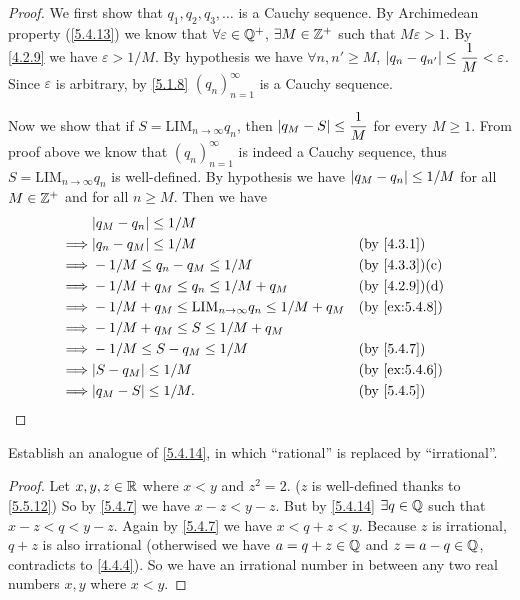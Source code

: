 \begin{proof}
  We first show that \(q_1, q_2, q_3, \dots\) is a Cauchy sequence.
  By Archimedean property (\cref{5.4.13}) we know that \(\forall \varepsilon \in \mathbb{Q}^+\), \(\exists M \in \mathbb{Z}^+\) such that \(M\varepsilon > 1\).
  By \cref{4.2.9} we have \(\varepsilon > 1 / M\).
  By hypothesis we have \(\forall n, n' \geq M\), \(\left\lvert q_n - q_{n'}\right\rvert \leq \dfrac{1}{M} < \varepsilon\).
  Since \(\varepsilon\) is arbitrary, by \cref{5.1.8} \((q_n)_{n = 1}^{\infty}\) is a Cauchy sequence.

  Now we show that if \(S = \text{LIM}_{n \to \infty} q_n\), then \(\left\lvert q_M - S\right\rvert \leq \dfrac{1}{M}\) for every \(M \geq 1\).
  From proof above we know that \((q_n)_{n = 1}^\infty\) is indeed a Cauchy sequence, thus \(S = \text{LIM}_{n \to \infty} q_n\) is well-defined.
  By hypothesis we have \(\left\lvert q_M - q_n\right\rvert \leq 1 / M\) for all \(M \in \mathbb{Z}^+\) and for all \(n \geq M\).
  Then we have
  \begin{align*}
             & \abs{q_M - q_n} \leq 1 / M                                                                        \\
    \implies & \abs{q_n - q_M} \leq 1 / M                                       &  & \by{4.3.1}                  \\
    \implies & -1 / M \leq q_n - q_M \leq 1 / M                                 &  & \text{(by \cref{4.3.3})(c)} \\
    \implies & -1 / M + q_M \leq q_n \leq 1 / M + q_M                           &  & \text{(by \cref{4.2.9})(d)} \\
    \implies & -1 / M + q_M \leq \text{LIM}_{n \to \infty} q_n \leq 1 / M + q_M &  & \by{ex:5.4.8}               \\
    \implies & -1 / M + q_M \leq S \leq 1 / M + q_M                                                              \\
    \implies & -1 / M \leq S - q_M \leq 1 / M                                   &  & \by{5.4.7}                  \\
    \implies & \abs{S - q_M} \leq 1 / M                                         &  & \by{ex:5.4.6}               \\
    \implies & \abs{q_M - S} \leq 1 / M.                                        &  & \by{5.4.5}
  \end{align*}
\end{proof}

\begin{ex}\label{ex:5.5.5}
  Establish an analogue of \cref{5.4.14}, in which ``rational'' is replaced by ``irrational''.
\end{ex}

\begin{proof}
  Let \(x, y, z \in \mathbb{R}\) where \(x < y\) and \(z^2 = 2\).
  (\(z\) is well-defined thanks to \cref{5.5.12})
  So by \cref{5.4.7} we have \(x - z < y - z\).
  But by \cref{5.4.14} \(\exists q \in \mathbb{Q}\) such that \(x - z < q < y - z\).
  Again by \cref{5.4.7} we have \(x < q + z < y\).
  Because \(z\) is irrational, \(q + z\) is also irrational
  (otherwised we have \(a = q + z \in \mathbb{Q}\) and \(z = a - q \in \mathbb{Q}\), contradicts to \cref{4.4.4}).
  So we have an irrational number in between any two real numbers \(x, y\) where \(x < y\).
\end{proof}
